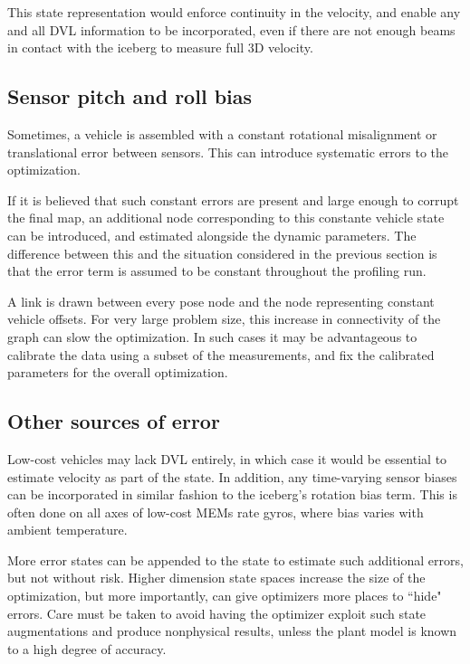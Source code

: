 This state representation would enforce continuity in the velocity, and enable any and all DVL information to be incorporated, even if there are not enough beams in contact with the iceberg to measure full 3D velocity.

\subsection{Sensor pitch and roll bias}

Sometimes, a vehicle is assembled with a constant rotational misalignment or translational error between sensors. This can introduce systematic errors to the optimization.

If it is believed that such constant errors are present and large enough to corrupt the final map, an additional node corresponding to this constante vehicle state can be introduced, and estimated alongside the dynamic parameters. The difference between this and the situation considered in the previous section is that the error term is assumed to be constant throughout the profiling run. 

A link is drawn between every pose node and the node representing constant vehicle offsets. For very large problem size, this increase in connectivity of the graph can slow the optimization. In such cases it may be advantageous to calibrate the data using a subset of the measurements, and fix the calibrated parameters for the overall optimization. 

\subsection{Other sources of error}

Low-cost vehicles may lack DVL entirely, in which case it would be essential to estimate velocity as part of the state. In addition, any time-varying sensor biases can be incorporated in similar fashion to the iceberg's rotation bias term. This is often done on all axes of low-cost MEMs rate gyros, where bias varies with ambient temperature. 

More error states can be appended to the state to estimate such additional errors, but not without risk. Higher dimension state spaces increase the size of the optimization, but more importantly, can give optimizers more places to ``hide" errors. Care must be taken to avoid having the optimizer exploit such state augmentations and produce nonphysical results, unless the plant model is known to a high degree of accuracy.
 
